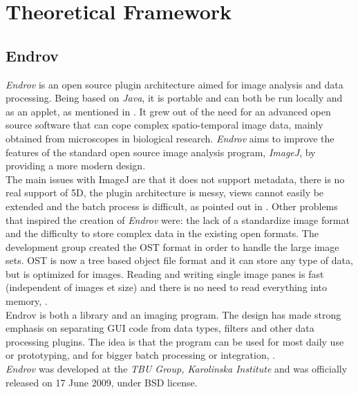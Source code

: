 \thispagestyle{empty}
\cleardoublepage
\chapter{Theoretical Framework}
\label{sec:dev}

\section{Endrov}
\label{sec:endrov}

\emph{Endrov} is an open source plugin architecture aimed for image analysis and data processing.
Being based on \emph{Java}, it is portable and can both be run locally and as an applet, as mentioned
in \cite{web:endrov}. It grew out of the need for an advanced open source software 
that can cope complex spatio-temporal image data, mainly obtained from microscopes in 
biological research. \emph{Endrov} aims to improve the features of the standard 
open source image analysis program, \emph{ImageJ}, by providing a more modern design.\\
The main issues with ImageJ are that it does not support metadata, there is no real support of 5D, 
the plugin architecture is messy, views cannot easily be extended and the batch 
process is difficult, as pointed out in \cite{web:endrovhome}.
Other problems that inspired the creation of \emph{Endrov} were: the lack of a standardize
image format and the difficulty to store complex data in the existing open formats.
The development group created the OST format in order
to handle the large image sets. OST is now a tree based object file format and it can store any 
type of data, but is optimized for images. 
Reading and writing single image panes is fast (independent of images et size) 
and there is no need to read everything into memory, \cite{web:endrovhome}.\\

Endrov is both a library and an imaging program. The design has made strong emphasis on 
separating GUI code from data types, filters and other data processing plugins. 
The idea is that the program can be used for most daily use or prototyping, and for 
bigger batch processing or integration, \cite{web:endrov}.\\

\emph{Endrov} was developed at the \emph{TBU Group, Karolinska Institute} and was officially released 
on 17 June 2009, under BSD license.



